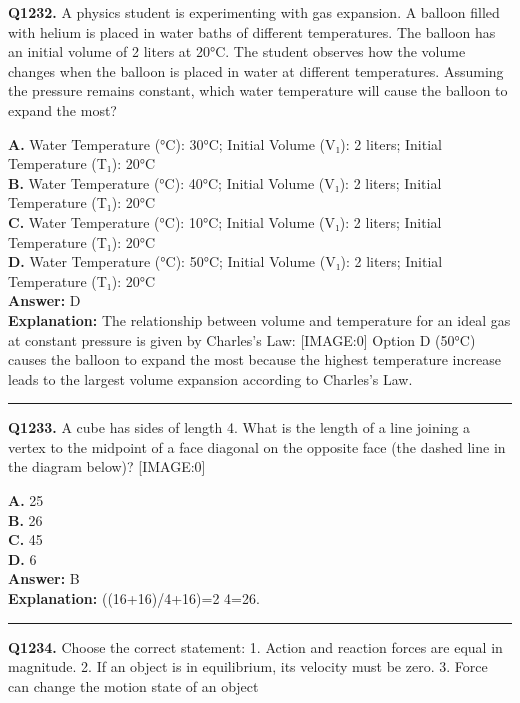 \documentclass[12pt]{article}
\begin{document}
\noindent
\textbf{Q1232.} A physics student is experimenting with gas expansion. A balloon filled with helium is placed in water baths of different temperatures. The balloon has an initial volume of 2 liters at 20°C. The student observes how the volume changes when the balloon is placed in water at different temperatures. Assuming the pressure remains constant, which water temperature will cause the balloon to expand the most?



\textbf{A.} Water Temperature (°C): 30°C; Initial Volume (V₁): 2 liters; Initial Temperature (T₁): 20°C \\
\textbf{B.} Water Temperature (°C): 40°C; Initial Volume (V₁): 2 liters; Initial Temperature (T₁): 20°C \\
\textbf{C.} Water Temperature (°C): 10°C; Initial Volume (V₁): 2 liters; Initial Temperature (T₁): 20°C \\
\textbf{D.} Water Temperature (°C): 50°C; Initial Volume (V₁): 2 liters; Initial Temperature (T₁): 20°C \\

\textbf{Answer:} D \\
\textbf{Explanation:} The relationship between volume and temperature for an ideal gas at constant pressure is given by Charles's Law:
[IMAGE:0]
Option D (50°C) causes the balloon to expand the most because the highest temperature increase leads to the largest volume expansion according to Charles's Law.

\hrule
\vspace{1em}


\noindent
\textbf{Q1233.} A cube has sides of length 4. What is the length of a line joining a vertex to the midpoint of a face diagonal on the opposite face (the dashed line in the diagram below)?
[IMAGE:0]



\textbf{A.} 2\sqrt{}5 \\
\textbf{B.} 2\sqrt{}6 \\
\textbf{C.} 4\sqrt{}5 \\
\textbf{D.} 6 \\

\textbf{Answer:} B \\
\textbf{Explanation:} \sqrt{}((16+16)/4+16)=\sqrt{}2 4=2\sqrt{}6.

\hrule
\vspace{1em}


\noindent
\textbf{Q1234.} Choose the correct statement:
1.
Action and reaction forces are equal in magnitude.
2.
If an object is in equilibrium, its velocity must be zero.
3.
Force can change the motion state of an object
\end{document}
